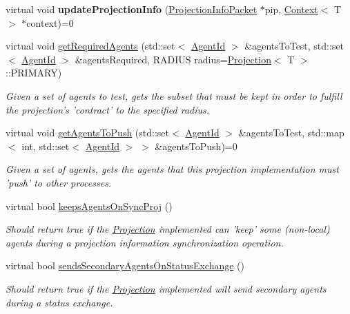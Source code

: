\begin{DoxyCompactItemize}
\item 
\hypertarget{classrepast_1_1_grid_a69f9208e8224c3a63a41c935906ffe6b}{virtual void {\bfseries update\-Projection\-Info} (\hyperlink{classrepast_1_1_projection_info_packet}{Projection\-Info\-Packet} $\ast$pip, \hyperlink{classrepast_1_1_context}{Context}$<$ T $>$ $\ast$context)=0}\label{classrepast_1_1_grid_a69f9208e8224c3a63a41c935906ffe6b}

\item 
virtual void \hyperlink{classrepast_1_1_grid_ab1ff08ad641de4f74eab53e30ad14eb6}{get\-Required\-Agents} (std\-::set$<$ \hyperlink{classrepast_1_1_agent_id}{Agent\-Id} $>$ \&agents\-To\-Test, std\-::set$<$ \hyperlink{classrepast_1_1_agent_id}{Agent\-Id} $>$ \&agents\-Required, R\-A\-D\-I\-U\-S radius=\hyperlink{classrepast_1_1_projection}{Projection}$<$ T $>$\-::P\-R\-I\-M\-A\-R\-Y)
\begin{DoxyCompactList}\small\item\em Given a set of agents to test, gets the subset that must be kept in order to fulfill the projection's 'contract' to the specified radius. \end{DoxyCompactList}\item 
virtual void \hyperlink{classrepast_1_1_grid_aa83b294fc8765e2f8ee44d8238855460}{get\-Agents\-To\-Push} (std\-::set$<$ \hyperlink{classrepast_1_1_agent_id}{Agent\-Id} $>$ \&agents\-To\-Test, std\-::map$<$ int, std\-::set$<$ \hyperlink{classrepast_1_1_agent_id}{Agent\-Id} $>$ $>$ \&agents\-To\-Push)=0
\begin{DoxyCompactList}\small\item\em Given a set of agents, gets the agents that this projection implementation must 'push' to other processes. \end{DoxyCompactList}\item 
virtual bool \hyperlink{classrepast_1_1_grid_aa46a5e7692430604bb3b04bbb9e2ff50}{keeps\-Agents\-On\-Sync\-Proj} ()
\begin{DoxyCompactList}\small\item\em Should return true if the \hyperlink{classrepast_1_1_projection}{Projection} implemented can 'keep' some (non-\/local) agents during a projection information synchronization operation. \end{DoxyCompactList}\item 
virtual bool \hyperlink{classrepast_1_1_grid_ae3b7e2de573a9212a58a527a9ab519b8}{sends\-Secondary\-Agents\-On\-Status\-Exchange} ()
\begin{DoxyCompactList}\small\item\em Should return true if the \hyperlink{classrepast_1_1_projection}{Projection} implemented will send secondary agents during a status exchange. \end{DoxyCompactList}\item 

\end{DoxyCompactItemize}
